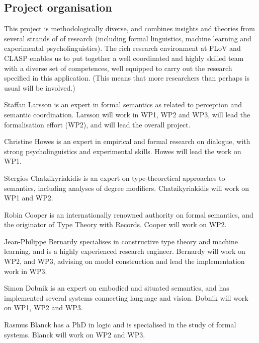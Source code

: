 \documentclass[11pt,a4paper]{article}
\newcommand{\instruction}[1]{}
\begin{document}
\subsection{Project organisation}

\instruction{Clarify the contributions of yourself and any participating researchers to the implementation of the project. Describe and explain the competences and roles of the participating researchers in the project, and also any other researchers or corresponding who are important for the implementation of the project.}

This project is methodologically diverse, and combines insights and theories from several strands of of research (including formal linguistics, machine learning and experimental psycholinguistics). The rich research environment at FLoV and CLASP enables us to put together a well coordinated and highly skilled team with a diverse set of competences, well equipped to carry out the research specified in this application. (This means that more researchers than perhaps is usual will be involved.) 

Staffan Larsson  is an expert in formal semantics as related to perception and semantic coordination. Larsson will work in WP1, WP2 and WP3, will lead the formalisation effort (WP2), and will lead the overall project.

Christine Howes is an expert in empirical and formal research on dialogue, with strong psycholinguistics and experimental skills. Howes will lead the work on WP1.

Stergios Chatzikyriakidis is an expert on type-theoretical approaches to semantics, including analyses of degree modifiers. Chatzikyriakidis will work on WP1 and WP2.

Robin Cooper is an internationally renowned authority on formal semantics, and the originator of Type Theory with Records. Cooper will work on WP2.

Jean-Philippe Bernardy specialises in constructive type theory and machine learning, and is a highly experienced research engineer. Bernardy will work on WP2, and WP3, advising on model construction and lead the implementation work in WP3.

Simon Dobnik is an expert on embodied and situated semantics, and has implemented several systems connecting language and vision. Dobnik will work on WP1, WP2 and WP3.  

Rasmus Blanck has a PhD in logic and is specialised in the study of formal systems. Blanck will work on WP2 and WP3.
\end{document}
